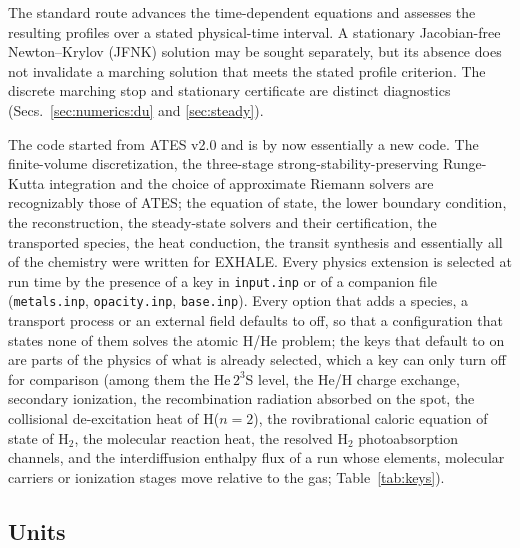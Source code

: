 The standard route advances the time-dependent equations and assesses the
resulting profiles over a stated physical-time interval. A stationary
Jacobian-free Newton--Krylov (JFNK) solution may be sought separately, but
its absence does not invalidate a marching solution that meets the stated
profile criterion. The discrete marching stop and stationary certificate
are distinct diagnostics (Secs.~\ref{sec:numerics:du} and \ref{sec:steady}).

The code started from ATES v2.0 \citep{Caldiroli2021, Biassoni2024} and is
by now essentially a new code.  The finite-volume discretization, the
three-stage strong-stability-preserving Runge-Kutta
integration and the choice of approximate Riemann solvers are recognizably
those of ATES; the equation of state, the lower boundary condition, the
reconstruction, the steady-state solvers and their certification, the
transported species, the heat conduction, the transit synthesis and
essentially all of the chemistry were written for EXHALE.  Every physics extension is selected at run time by the
presence of a key in \texttt{input.inp} or of a companion file
(\texttt{metals.inp}, \texttt{opacity.inp}, \texttt{base.inp}).  Every
option that adds a species, a transport process or an external field defaults
to off, so that a configuration that states none of them solves the atomic
H/He problem; the keys that default to on are parts of the physics of what is
already selected, which a key can only turn off for comparison (among them the
He\,$2^3$S level, the He/H charge exchange, secondary ionization, the
recombination radiation absorbed on the spot, the collisional de-excitation
heat of H($n{=}2$), the rovibrational caloric equation of state of H$_2$, the
molecular reaction heat, the resolved H$_2$ photoabsorption channels, and the
interdiffusion enthalpy flux of a run whose elements, molecular carriers or
ionization stages move relative to the gas; Table~\ref{tab:keys}).

\subsection{Units}
\label{sec:intro:units}

